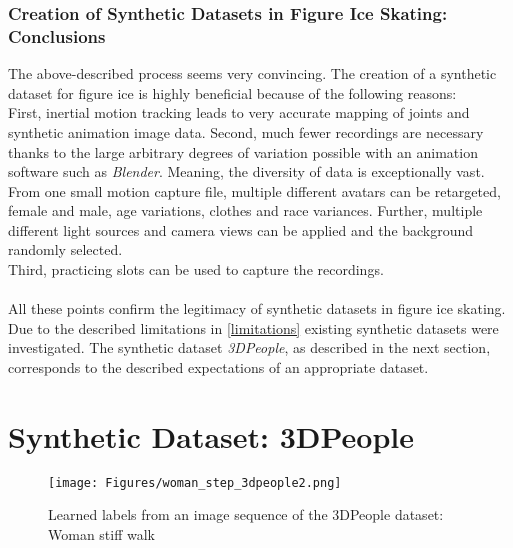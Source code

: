 \subsubsection*{Creation of Synthetic Datasets in Figure Ice Skating: Conclusions}
The above-described process seems very convincing.
The creation of a synthetic dataset for figure ice is highly beneficial
because of the following reasons:\\
First, inertial motion tracking leads to very accurate mapping of joints and synthetic animation image data.
Second, much fewer recordings are necessary thanks to the large arbitrary degrees of variation possible with
an animation software such as \textit{Blender}.
Meaning, the diversity of data is exceptionally vast.
From one small motion capture file, multiple different avatars can be retargeted, female and male, age variations,
clothes and race variances.
Further, multiple different light sources and camera views can be applied and the background randomly selected.\\
Third, practicing slots can be used to capture the recordings.
\\\mbox{}\\
All these points confirm the legitimacy of synthetic datasets in figure ice skating.
Due to the described limitations in \autoref{limitations} existing synthetic datasets were investigated.
The synthetic dataset \textit{3DPeople}, as described in the next section, corresponds to the described expectations of an appropriate dataset.




\section{Synthetic Dataset: 3DPeople}

\begin{figure}
    \centering
    \texttt{[image: Figures/woman\_step\_3dpeople2.png]}
    \decoRule
    \caption[3DPeople: Woman stiff walk (labeled)]{Learned labels from an image sequence of the 3DPeople dataset: Woman stiff walk}
    \label{fig:woman_step_3dpeople}
\end{figure}


